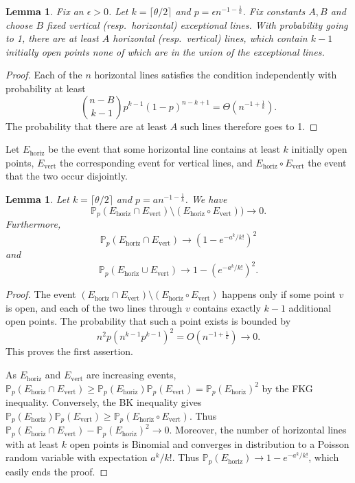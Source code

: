 \documentclass{amsart}
\newcommand{\prob}{\mathbb{P}}
\newcommand{\threshold}{\theta}
\newcommand{\vertical}{\text{vert}}
\newcommand{\horizontal}{\text{horiz}}
\numberwithin{equation}{section}
\newtheorem{lemma}[theorem]{Lemma}
\theoremstyle{definition}
\theoremstyle{remark}
\begin{document}
\begin{lemma} \label{underlines} Fix an $\epsilon>0$. 
Let $k = \lceil \threshold/2\rceil$ and $p = \epsilon n^{-1-\frac{1}{k}}$. Fix constants $A,B$
and choose $B$ fixed vertical (resp.~horizontal) exceptional lines.  
With probability going to 1, there are at least $A$ horizontal (resp.~vertical) 
lines, which contain $k-1$ initially open points none of 
which are in the union of the exceptional lines. 
\end{lemma}
\begin{proof}
Each of the $n$ horizontal lines satisfies the condition independently with probability at least
$${{n-B} \choose {k-1}}p^{k-1}(1-p)^{n-k+1} = \Theta(n^{-1+\frac{1}{k}}).$$
The probability that there are at least $A$ such lines 
therefore goes to 1.
\end{proof}

Let $E_{\horizontal}$ be the event that some horizontal line contains at least 
$k$ initially open points, $E_{\vertical}$ the corresponding event for vertical lines, and 
 $E_{\horizontal} \circ E_{\vertical}$ the event that the two occur disjointly. 

\begin{lemma} \label{e1e2}
Let $k = \lceil \threshold/2\rceil$ and $p = a n^{-1-\frac{1}{k}}$.  We have $$\prob_p(E_{\horizontal} \cap E_{\vertical}) \setminus (E_{\horizontal} \circ E_{\vertical})) \to 0.$$ Furthermore, 
$$\prob_p(E_{\horizontal} \cap E_{\vertical}) \to (1-e^{-a^k/k!})^2$$ and 
$$\prob_p(E_{\horizontal} \cup E_{\vertical}) \to 1-(e^{-a^k/k!})^2.$$
\end{lemma}
\begin{proof}
The event $(E_{\horizontal} \cap E_{\vertical}) \setminus (E_{\horizontal} \circ E_{\vertical})$ happens only if some point $v$ is open, and each of the two lines through $v$ contains exactly $k-1$ additional open points. 
The probability that such a point exists is bounded by 
$$n^2p\left({n^ {k-1}}p^{k-1}\right)^2 = O(n^{-1+\frac{1}{k}}) \to 0.$$ This 
proves the first assertion.

As $E_{\horizontal}$ and $E_{\vertical}$ are increasing events, $\prob_p(E_{\horizontal} \cap E_{\vertical})\ge \prob_p(E_{\horizontal})\prob_p(E_{\vertical})=\prob_p(E_{\horizontal})^2$
by the FKG inequality. 
Conversely, the BK inequality gives
$\prob_p(E_{\horizontal})\prob_p(E_{\vertical}) \ge \prob_p(E_{\horizontal} \circ E_{\vertical})$.  
Thus $\prob_p(E_{\horizontal} \cap E_{\vertical})- \prob_p(E_{\horizontal})^2\to 0$. Moreover,
the number of horizontal lines with at least $k$ open points is Binomial and converges 
in distribution to  
a Poisson random variable with expectation $a^k/k!$. Thus $\prob_p(E_{\horizontal})\to 1-e^{-a^k/k!}$, 
which easily ends the proof.
\end{proof}
\end{document}
